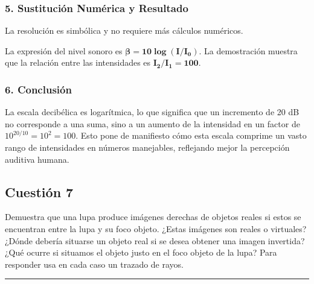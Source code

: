 \subsubsection*{5. Sustitución Numérica y Resultado}
La resolución es simbólica y no requiere más cálculos numéricos.
\begin{cajaresultado}
    La expresión del nivel sonoro es $\boldsymbol{\beta = 10 \log(I/I_0)}$. La demostración muestra que la relación entre las intensidades es $\boldsymbol{I_2/I_1 = 100}$.
\end{cajaresultado}

\subsubsection*{6. Conclusión}
\begin{cajaconclusion}
La escala decibélica es logarítmica, lo que significa que un incremento de 20 dB no corresponde a una suma, sino a un aumento de la intensidad en un factor de $10^{20/10} = 10^2 = 100$. Esto pone de manifiesto cómo esta escala comprime un vasto rango de intensidades en números manejables, reflejando mejor la percepción auditiva humana.
\end{cajaconclusion}

\newpage

\subsection{Cuestión 7}
\label{subsec:C7_2023_jul_ord}

\begin{cajaenunciado}
Demuestra que una lupa produce imágenes derechas de objetos reales si estos se encuentran entre la lupa y su foco objeto. ¿Estas imágenes son reales o virtuales? ¿Dónde debería situarse un objeto real si se desea obtener una imagen invertida? ¿Qué ocurre si situamos el objeto justo en el foco objeto de la lupa? Para responder usa en cada caso un trazado de rayos.
\end{cajaenunciado}
\hrule

